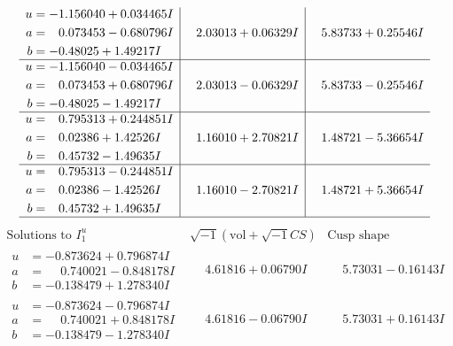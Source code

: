 \documentclass[1p]{elsarticle_modified}
\theoremstyle{definition}
\newcommand{\I}{\sqrt{-1}}
\begin{document}
$$\begin{array}{c|c|c}
\begin{aligned}
u &= -1.156040 + 0.034465 I \\
a &= \phantom{-}0.073453 - 0.680796 I \\
b &= -0.48025 + 1.49217 I\end{aligned}
 & \phantom{-}2.03013 + 0.06329 I & \phantom{-}5.83733 + 0.25546 I \\ \hline\begin{aligned}
u &= -1.156040 - 0.034465 I \\
a &= \phantom{-}0.073453 + 0.680796 I \\
b &= -0.48025 - 1.49217 I\end{aligned}
 & \phantom{-}2.03013 - 0.06329 I & \phantom{-}5.83733 - 0.25546 I \\ \hline\begin{aligned}
u &= \phantom{-}0.795313 + 0.244851 I \\
a &= \phantom{-}0.02386 + 1.42526 I \\
b &= \phantom{-}0.45732 - 1.49635 I\end{aligned}
 & \phantom{-}1.16010 + 2.70821 I & \phantom{-}1.48721 - 5.36654 I \\ \hline\begin{aligned}
u &= \phantom{-}0.795313 - 0.244851 I \\
a &= \phantom{-}0.02386 - 1.42526 I \\
b &= \phantom{-}0.45732 + 1.49635 I\end{aligned}
 & \phantom{-}1.16010 - 2.70821 I & \phantom{-}1.48721 + 5.36654 I\\
 \hline 
 \end{array}$$\newpage$$\begin{array}{c|c|c}  
\text{Solutions to }I^u_{1}& \I (\text{vol} + \sqrt{-1}CS) & \text{Cusp shape}\\
 \hline 
\begin{aligned}
u &= -0.873624 + 0.796874 I \\
a &= \phantom{-}0.740021 - 0.848178 I \\
b &= -0.138479 + 1.278340 I\end{aligned}
 & \phantom{-}4.61816 + 0.06790 I & \phantom{-}5.73031 - 0.16143 I \\ \hline\begin{aligned}
u &= -0.873624 - 0.796874 I \\
a &= \phantom{-}0.740021 + 0.848178 I \\
b &= -0.138479 - 1.278340 I\end{aligned}
 & \phantom{-}4.61816 - 0.06790 I & \phantom{-}5.73031 + 0.16143 I \\ \hline\begin{aligned}

\end{aligned}
\end{array}$$
\end{document}
